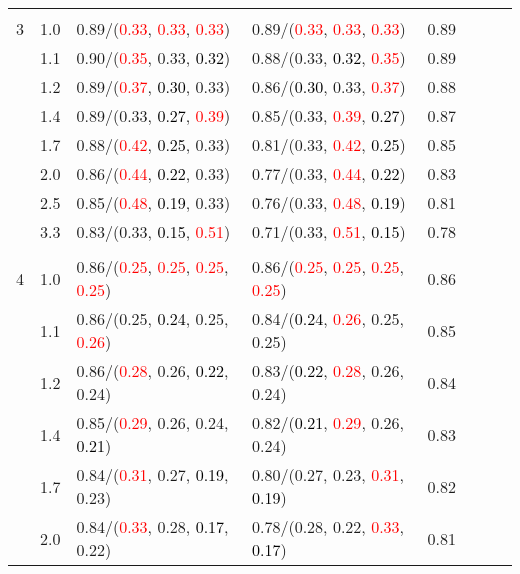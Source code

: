 \documentclass[10pt,a4paper]{report}
\begin{document}
\begin{table}[!htbp]
\begin{center}
{\begin{tabular}{ccllcccc}
			&&&&\\
			3			&1.0&0.89/(\textcolor{red}{0.33}, \textcolor{red}{0.33}, \textcolor{red}{0.33})&0.89/(\textcolor{red}{0.33}, \textcolor{red}{0.33}, \textcolor{red}{0.33})&0.89\\
			&1.1&0.90/(\textcolor{red}{0.35}, 0.33, \textcolor{black}{0.32})&0.88/(0.33, \textcolor{black}{0.32}, \textcolor{red}{0.35})&0.89\\
			&1.2&0.89/(\textcolor{red}{0.37}, \textcolor{black}{0.30}, 0.33)&0.86/(\textcolor{black}{0.30}, 0.33, \textcolor{red}{0.37})&0.88\\
			&1.4&0.89/(0.33, \textcolor{black}{0.27}, \textcolor{red}{0.39})&0.85/(0.33, \textcolor{red}{0.39}, \textcolor{black}{0.27})&0.87\\
			&1.7&0.88/(\textcolor{red}{0.42}, \textcolor{black}{0.25}, 0.33)&0.81/(0.33, \textcolor{red}{0.42}, \textcolor{black}{0.25})&0.85\\
			&2.0&0.86/(\textcolor{red}{0.44}, \textcolor{black}{0.22}, 0.33)&0.77/(0.33, \textcolor{red}{0.44}, \textcolor{black}{0.22})&0.83\\
			&2.5&0.85/(\textcolor{red}{0.48}, \textcolor{black}{0.19}, 0.33)&0.76/(0.33, \textcolor{red}{0.48}, \textcolor{black}{0.19})&0.81\\
			&3.3&0.83/(0.33, \textcolor{black}{0.15}, \textcolor{red}{0.51})&0.71/(0.33, \textcolor{red}{0.51}, \textcolor{black}{0.15})&0.78\\
			&&&&\\
			4			&1.0&0.86/(\textcolor{red}{0.25}, \textcolor{red}{0.25}, \textcolor{red}{0.25}, \textcolor{red}{0.25})&0.86/(\textcolor{red}{0.25}, \textcolor{red}{0.25}, \textcolor{red}{0.25}, \textcolor{red}{0.25})&0.86\\
			&1.1&0.86/(0.25, \textcolor{black}{0.24}, 0.25, \textcolor{red}{0.26})&0.84/(\textcolor{black}{0.24}, \textcolor{red}{0.26}, 0.25, 0.25)&0.85\\
			&1.2&0.86/(\textcolor{red}{0.28}, 0.26, \textcolor{black}{0.22}, 0.24)&0.83/(\textcolor{black}{0.22}, \textcolor{red}{0.28}, 0.26, 0.24)&0.84\\
			&1.4&0.85/(\textcolor{red}{0.29}, 0.26, 0.24, \textcolor{black}{0.21})&0.82/(\textcolor{black}{0.21}, \textcolor{red}{0.29}, 0.26, 0.24)&0.83\\
			&1.7&0.84/(\textcolor{red}{0.31}, 0.27, \textcolor{black}{0.19}, 0.23)&0.80/(0.27, 0.23, \textcolor{red}{0.31}, \textcolor{black}{0.19})&0.82\\
			&2.0&0.84/(\textcolor{red}{0.33}, 0.28, \textcolor{black}{0.17}, 0.22)&0.78/(0.28, 0.22, \textcolor{red}{0.33}, \textcolor{black}{0.17})&0.81\\

\end{tabular}}
\end{center}
\end{table}
\end{document}
